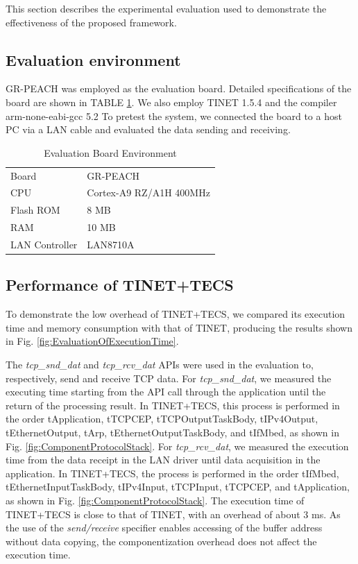 \documentclass[conference]{IEEEtran/IEEEtran}
\begin{document}
This section describes the experimental evaluation used to demonstrate the effectiveness of the proposed framework.

\subsection{Evaluation environment}

GR-PEACH was employed as the evaluation board.
Detailed specifications of the board are shown in TABLE \ref{tab:EvaluationBoardEnvironment}.
We also employ TINET 1.5.4 and the compiler arm-none-eabi-gcc 5.2
To pretest the system, we connected the board to a host PC via a LAN cable and evaluated the data sending and receiving.

\begin{table}[t]
    \centering
    \vspace{-1mm} \caption{Evaluation Board Environment}
    \begin{tabular}{l|l}
        \hline\hline
        Board           &   GR-PEACH                \\
        CPU             &   Cortex-A9 RZ/A1H 400MHz \\
        Flash ROM       &   8 MB                    \\
        RAM             &   10 MB                   \\
        LAN Controller  &   LAN8710A                \\
        \hline
    \end{tabular}
    \label{tab:EvaluationBoardEnvironment}
\end{table}

\subsection{Performance of TINET+TECS}

To demonstrate the low overhead of TINET+TECS, we compared its execution time and memory consumption with that of TINET, producing the results shown in Fig. \ref{fig:EvaluationOfExecutionTime}.

The {\it tcp\_snd\_dat} and {\it tcp\_rcv\_dat} APIs were used in the evaluation to, respectively, send and receive TCP data.
For {\it tcp\_snd\_dat}, we measured the executing time starting from the API call through the application until the return of the processing result.
In TINET+TECS, this process is performed in the order tApplication, tTCPCEP, tTCPOutputTaskBody, tIPv4Output, tEthernetOutput, tArp, tEthernetOutputTaskBody, and tIfMbed, as shown in Fig. \ref{fig:ComponentProtocolStack}.
For {\it tcp\_rcv\_dat}, we measured the execution time from the data receipt in the LAN driver until data acquisition in the application.
In TINET+TECS, the process is performed in the order tIfMbed, tEthernetInputTaskBody, tIPv4Input, tTCPInput, tTCPCEP, and tApplication, as shown in Fig. \ref{fig:ComponentProtocolStack}.
The execution time of TINET+TECS is close to that of TINET, with an overhead of about 3 ms.
As the use of the {\it send/receive} specifier enables accessing of the buffer address without data copying, the componentization overhead does not affect the execution time.
\end{document}
